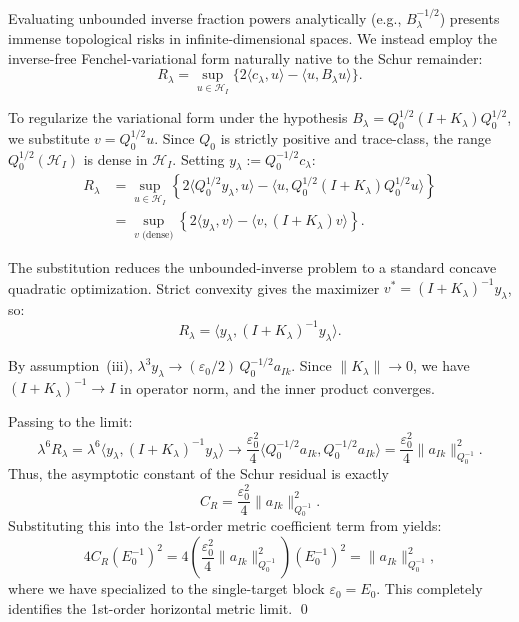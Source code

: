 Evaluating unbounded inverse fraction powers analytically (e.g., $B_\lambda^{-1/2}$) presents immense topological risks in infinite-dimensional spaces. We instead employ the inverse-free Fenchel-variational form naturally native to the Schur remainder:
\begin{equation}
  R_\lambda = \sup_{u \in \mathcal{H}_I} \{ 2\langle c_\lambda, u \rangle - \langle u, B_\lambda u \rangle \}.
\end{equation}

To regularize the variational form under the hypothesis $B_\lambda = Q_0^{1/2}(I + K_\lambda) Q_0^{1/2}$, we substitute $v = Q_0^{1/2} u$. Since $Q_0$ is strictly positive and trace-class, the range $Q_0^{1/2}(\mathcal{H}_I)$ is dense in $\mathcal{H}_I$. Setting $y_\lambda := Q_0^{-1/2} c_\lambda$:
\begin{align}
  R_\lambda &= \sup_{u \in \mathcal{H}_I} \left\{ 2\langle Q_0^{1/2} y_\lambda, u \rangle - \langle u, Q_0^{1/2}(I + K_\lambda)Q_0^{1/2} u \rangle \right\} \nonumber \\
  &= \sup_{v \text{ (dense)}} \left\{ 2\langle y_\lambda, v \rangle - \langle v, (I+K_\lambda) v \rangle \right\}.
\end{align}

The substitution reduces the unbounded-inverse problem to a standard concave quadratic optimization. Strict convexity gives the maximizer $v^* = (I+K_\lambda)^{-1} y_\lambda$, so:
\begin{equation}
  R_\lambda = \langle y_\lambda, (I+K_\lambda)^{-1} y_\lambda \rangle.
\end{equation}

By assumption~(iii), $\lambda^3 y_\lambda \to (\varepsilon_0/2)\,Q_0^{-1/2} a_{Ik}$. Since $\|K_\lambda\| \to 0$, we have $(I+K_\lambda)^{-1} \to I$ in operator norm, and the inner product converges.

Passing to the limit:
\begin{equation}
  \lambda^6 R_\lambda
  = \lambda^6 \langle y_\lambda, (I + K_\lambda)^{-1} y_\lambda \rangle
  \to \frac{\varepsilon_0^2}{4} \langle Q_0^{-1/2} a_{Ik}, Q_0^{-1/2} a_{Ik} \rangle
  = \frac{\varepsilon_0^2}{4} \|a_{Ik}\|_{Q_0^{-1}}^2.
\end{equation}
Thus, the asymptotic constant of the Schur residual is exactly
\begin{equation}
  C_R = \frac{\varepsilon_0^2}{4} \|a_{Ik}\|_{Q_0^{-1}}^2.
\end{equation}
Substituting this into the 1st-order metric coefficient term from  yields:
\begin{equation}
  4 C_R (E_0^{-1})^2 = 4 \left( \frac{\varepsilon_0^2}{4} \|a_{Ik}\|_{Q_0^{-1}}^2 \right) (E_0^{-1})^2 = \|a_{Ik}\|_{Q_0^{-1}}^2,
\end{equation}
where we have specialized to the single-target block $\varepsilon_0 = E_0$. This completely identifies the 1st-order horizontal metric limit. \qed



